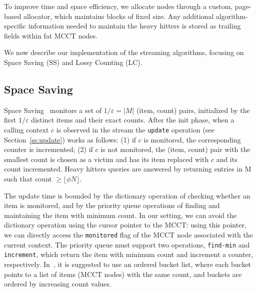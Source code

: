 \documentclass[preprint]{sigplanconf}
\begin{document}
To improve time and space efficiency, we allocate nodes through a custom, page-based allocator, which maintains blocks of fixed size. 
Any additional algorithm-specific information needed to maintain the heavy hitters is stored as trailing fields within fat MCCT nodes.


We now describe our implementation of the streaming algorithms, focusing on Space Saving (SS) and Lossy Counting (LC).
 
\subsection{Space Saving}
\label{ss:ss}

Space Saving~\cite{MAA06} monitors a set of $1/\varepsilon=|M|$ (item, count) pairs, initialized by the first $1/\varepsilon$ distinct items and their exact counts. After the init phase, when a calling context $c$ is observed in the stream the {\tt update} operation (see Section~\ref{ss:update}) works as follows: (1) if $c$ is monitored, the corresponding counter is incremented; (2) if $c$ is not monitored, the (item, count) pair with the smallest count is chosen as a victim and has its item replaced with $c$ and its count incremented. Heavy hitters queries are answered by returning entries in M such that count $\geq \lfloor\phi N\rfloor$.

The update time is bounded by the dictionary operation of checking whether an item is monitored, and by the priority queue operations of finding and maintaining the item with minimum count. In our setting, we can avoid the dictionary operation using the cursor pointer to the MCCT: using this pointer, we can directly access the {\tt monitored} flag of the MCCT node associated with the current context. The priority queue must support two operations, {\tt find-min} and {\tt increment}, which return the item with minimum count and increment a counter, respectively. In~\cite{MAA06}, it is suggested to use an ordered bucket list, where each bucket points to a list of items (MCCT nodes) with the same count, and buckets are ordered by increasing count values. 
\end{document}
